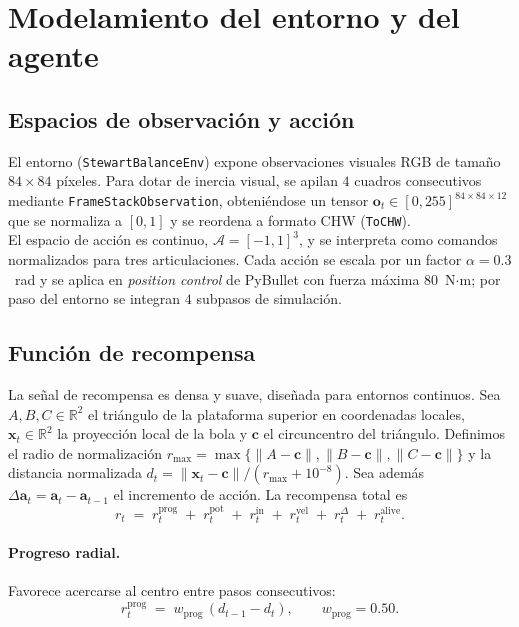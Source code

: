\documentclass[conference]{IEEEtran}
\begin{document}
\section{Modelamiento del entorno y del agente}
\label{sec:modelado}

\subsection{Espacios de observación y acción}
El entorno (\texttt{StewartBalanceEnv}) expone observaciones visuales RGB de tamaño $84{\times}84$ píxeles. Para dotar de inercia visual, se apilan $4$ cuadros consecutivos mediante \texttt{FrameStackObservation}, obteniéndose un tensor $\mathbf{o}_t \in [0,255]^{84\times 84\times 12}$ que se normaliza a $[0,1]$ y se reordena a formato CHW (\texttt{ToCHW}).\\
El espacio de acción es continuo, $\mathcal{A}=[-1,1]^3$, y se interpreta como comandos normalizados para tres articulaciones. Cada acción se escala por un factor $\alpha{=}0.3$~rad y se aplica en \textit{position control} de PyBullet con fuerza máxima $80$~N$\cdot$m; por paso del entorno se integran $4$ subpasos de simulación.

\subsection{Función de recompensa}
La señal de recompensa es densa y suave, diseñada para entornos continuos. Sea
$A,B,C\in\mathbb{R}^2$ el triángulo de la plataforma superior en coordenadas locales,
$\mathbf{x}_t\!\in\!\mathbb{R}^2$ la proyección local de la bola y
$\mathbf{c}$ el circuncentro del triángulo.
Definimos el radio de normalización
$
r_{\max}=\max\{\|\!A-\mathbf{c}\!\|,\|\!B-\mathbf{c}\!\|,\|\!C-\mathbf{c}\!\|\}
$
y la distancia normalizada
$
d_t=\|\mathbf{x}_t-\mathbf{c}\|/(r_{\max}+10^{-8}).
$
Sea además $\Delta\mathbf{a}_t=\mathbf{a}_t-\mathbf{a}_{t-1}$ el incremento de acción.
La recompensa total es
\begin{equation}
\label{eq:rt-sum}
r_t \;=\; r_t^{\mathrm{prog}} \;+\; r_t^{\mathrm{pot}} \;+\;
r_t^{\mathrm{in}} \;+\; r_t^{\mathrm{vel}} \;+\;
r_t^{\Delta} \;+\; r_t^{\mathrm{alive}} .
\end{equation}

\paragraph{Progreso radial.}
Favorece acercarse al centro entre pasos consecutivos:
\begin{equation}
r_t^{\mathrm{prog}} \;=\; w_{\mathrm{prog}}\,(d_{t-1}-d_t), \qquad w_{\mathrm{prog}}=0.50.
\end{equation}
\end{document}
